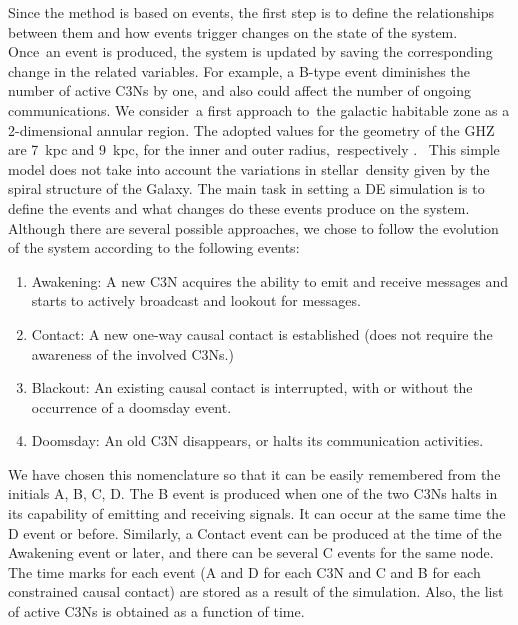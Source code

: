 \documentclass[crop]{CSLB}
\newcommand{\ceti}{C3N}
\newcommand{\cetis}{C3Ns}
\newcommand{\blackout}{B event }
\newcommand{\doomsday}{D event }
\newcommand{\aawakening}{Awakening event }
\newcommand{\ccontact}{Contact event }
\newcommand{\contacts}{C events }
\begin{document}
Since the method is based on events, the first step is to define the
relationships between them and how events trigger changes on the state of the
system.
%
Once an event is produced, the system is updated by saving the corresponding
change in the related variables.
%
For example, a B-type event diminishes the number of active \cetis{} by one,
and also could affect the number of ongoing communications.
%
We consider a first approach to the galactic habitable zone as a 2-dimensional
annular region.
%
The adopted values for the geometry of the GHZ are 7~kpc and 9~kpc, for the
inner and outer radius, respectively \citep{lineweaver_galactic_2004}. 
%
This simple model does not take into account the variations in stellar density
given by the spiral structure of the Galaxy.
%
The main task in setting a DE simulation is to define the events and what
changes do these events produce on the system.
%
Although there are several possible approaches, we chose to follow the
evolution of the system according to the following events:

\begin{enumerate}
   \item[(A)] Awakening: A new \ceti{} acquires the ability to emit
      and receive messages and starts to actively broadcast and
      lookout for messages.
   \item[(C)] Contact: A new one-way causal contact is established
      (does not require the awareness of the involved \cetis{}.)
   \item[(B)] Blackout: An existing causal contact is interrupted,
      with or without the occurrence of a doomsday event.
   \item[(D)] Doomsday: An old \ceti{} disappears, or halts its
      communication activities.
\end{enumerate}

We have chosen this nomenclature so that it can be easily remembered
from the initials A, B, C, D.
%
The \blackout is produced when one of the two \cetis{} halts in its
capability of emitting and receiving signals.
%
It can occur at the same time the \doomsday or before.
%
Similarly, a \ccontact can be produced at the time of the \aawakening
or later, and there can be several \contacts for the same node.
%
The time marks for each event (A and D for each \ceti{} and C and B
for each constrained causal contact) are stored as a result of the simulation.
%
Also, the list of active \cetis{} is obtained as a function of time.
%
\end{document}
